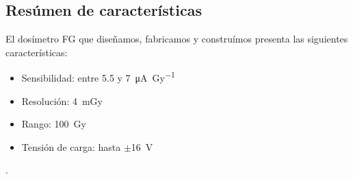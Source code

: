 \subsection{Resúmen de características}
El dosímetro FG que diseñamos, fabricamos y construímos presenta las
siguientes características:
\begin{itemize}
    \item Sensibilidad: entre 5.5 y \SI{7}{\micro\ampere\per\gray}
    \item Resolución: \SI{4}{\milli\gray}
    \item Rango: \SI{100}{\gray}
    \item Tensión de carga: hasta $\pm$\SI{16}{\volt}
\end{itemize}.
